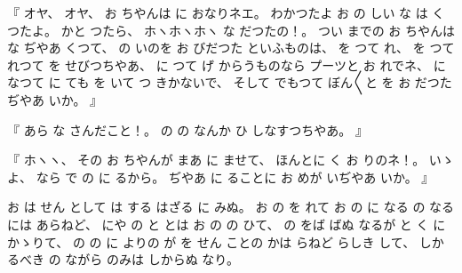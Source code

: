 %
『
オヤ、
%
オヤ、
%
お
ちやんは
に
おなりネエ。
%
わかつたよ
お
の
しい
な
は
く
つたよ。
%
かと
つたら、
%
ホヽホヽホヽ
な
だつたの！。
%
つい
までの
お
ちやんは
な
ぢやあ
くつて、
%
の
いのを
お
びだつた
といふものは、
を
つて
れ、
%
を
つて
れつて
を
せびつちやあ、
%
に
つて
げ
からうものなら
プーツと
お
れでネ、
%
に
なつて
に
ても
を
いて
つ
きかないで、
%
そして
でもつて
ぼん〳〵と
を
お
だつたぢやあ
いか。
』

%
『
あら
な
さんだこと！。
%
の
の
なんか
ひ
しなすつちやあ。
』

%
『
ホヽヽ、
%
その
お
ちやんが
まあ
に
ませて、
%
ほんとに
く
お
りのネ！。
%
いゝよ、
%
なら
で
の
に
るから。
%
ぢやあ
に
ることに
お
めが
いぢやあ
いか。
』

%
お
は
せん
として
は
する
はざる
に
みぬ。
%
お
の
を
れて
お
の
に
なる
の
なる
には
あらねど、
%
にや
の
と
とは
お
の
の
ひて、
%
の
をば
ばぬ
なるが
と
く
に
かゝりて、
%
の
の
に
よりの
が
を
せん
ことの
かは
らねど
らしき
して、
%
しかるべき
の
ながら
のみは
しからぬ
なり。
